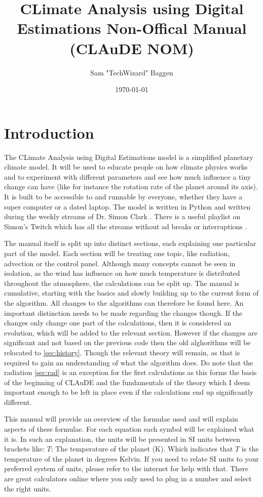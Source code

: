 \documentclass{article}
\title{CLimate Analysis using Digital Estimations Non-Offical Manual (CLAuDE NOM)}
\author{Sam "TechWizard" Baggen}
\date{\today}
\begin{document}
\maketitle

\tableofcontents

\newpage

\section{Introduction}

The CLimate Analysis using Digital Estimations model is a simplified planetary climate model. It will be used to educate people on how climate physics works and to experiment with different 
parameters and see how much influence a tiny change can have (like for instance the rotation rate of the planet around its axis). It is built to be accessible to and runnable by everyone, 
whether they have a super computer or a dated laptop. The model is written in Python and written during the weekly streams of Dr. Simon Clark \cite{twitch}. There is a useful playlist on 
Simon's Twitch which has all the streams without ad breaks or interruptions \cite{playlist}. 

The manual itself is split up into distinct sections, each explaining one particular part of the model. Each section will be treating one topic, like radiation, advection or the control panel.
Although many concepts cannot be seen in isolation, as the wind has influence on how much temperature is distributed throughout the atmosphere, the calculations can be split up. The manual is 
cumulative, starting with the basics and slowly building up to the current form of the algorithm. All changes to the algorithms can therefore be found here. An important distinction needs to be 
made regarding the changes though. If the changes only change one part of the calculations, then it is considered an evolution, which will be added to the relevant section. However if the changes 
are significant and not based on the previous code then the old alghorithms will be relocated to \autoref{sec:history}. Though the relevant theory will remain, as that is required to gain an 
understanding of what the algorithm does. Do note that the radiation \autoref{sec:rad} is an exception for the first calculations as this forms the basis of the beginning of CLAuDE and the 
fundamentals of the theory which I deem important enough to be left in place even if the calculations end up significantly different.

This manual will provide an overview of the formulae used and will explain aspects of these formulae. For each equation each symbol will be explained what it is. In such an explanation, the 
units will be presented in SI units \cite{SI} between brackets like: $T$: The temperature of the planet (\si{K}). Which indicates that $T$ is the temperature of the planet in degrees Kelvin. If 
you need to relate SI units to your preferred system of units, please refer to the internet for help with that. There are great calculators online where you only need to plug in a number and 
select the right units.
\end{document}
